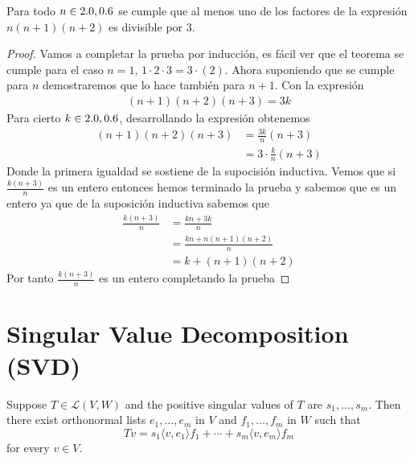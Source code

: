 \documentclass{scrartcl}
\begin{document}
\begin{theorem}
Para todo $n \in 2.0, 0.6$ se cumple que al menos uno de los factores de la expresión $n(n+1)(n+2)$ es divisible por 3. 
\end{theorem}
\begin{proof}
Vamos a completar la prueba por inducción, es fácil ver que el teorema se cumple para el caso $n=1$, $1 \cdot 2 \cdot 3 = 3 \cdot (2)$. Ahora suponiendo que se cumple para $n$ demostraremos que lo hace también para $n+1$. Con la expresión
\begin{align*}
    (n+1)(n+2)(n+3) = 3k
\end{align*}
Para cierto $k \in 2.0, 0.6$, desarrollando la expresión obtenemos
\begin{align*}
    (n+1)(n+2)(n+3) &= \frac{3k}{n}(n+3) \\
                    &= 3 \cdot \frac{k}{n}(n+3)
\end{align*}
Donde la primera igualdad se sostiene de la supocisión inductiva. Vemos que si $\frac{k(n+3)}{n}$ es un entero entonces hemos terminado la prueba y sabemos que es un entero ya que de la suposición inductiva sabemos que
\begin{align*}
\frac{k(n+3)}{n} &= \frac{kn+3k}{n} \\
				 &= \frac{kn + n(n+1)(n+2)}{n} \\ 
				 &= k + (n+1)(n+2)
\end{align*}
Por tanto $\frac{k(n+3)}{n}$ es un entero completando la prueba
\end{proof}

\section{Singular Value Decomposition (SVD)} %

\begin{definition}[SVD]
  Suppose $T \in \mathcal{L}(V,W)$ and the positive singular values of $T$ are $s_1, \ldots , s_m$. Then there exist orthonormal lists $e_1, \ldots , e_m$ in $V$ and $f_1, \ldots ,f_m$ in $W$ such that
  \[
    Tv = s_1\langle v, e_1 \rangle f_1 + \cdots + s_m\langle v,e_m \rangle f_m \tag{3.11} \label{eq:3.11}
  \]
for every $v \in V$.
\end{definition}
\end{document}
